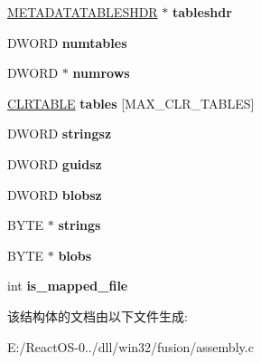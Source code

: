 \begin{DoxyCompactItemize}
\hyperlink{struct_m_e_t_a_d_a_t_a_t_a_b_l_e_s_h_d_r}{M\+E\+T\+A\+D\+A\+T\+A\+T\+A\+B\+L\+E\+S\+H\+DR} $\ast$ {\bfseries tableshdr}
\item 
\mbox{\label{structtag_a_s_s_e_m_b_l_y_a3613de571c417cc149481720220a6c7c}} 
D\+W\+O\+RD {\bfseries numtables}
\item 
\mbox{\label{structtag_a_s_s_e_m_b_l_y_a88a3d5b2f384314cdedd20bd1ce5ec3e}} 
D\+W\+O\+RD $\ast$ {\bfseries numrows}
\item 
\mbox{\label{structtag_a_s_s_e_m_b_l_y_a619124aeb08751554e52547e64e52961}} 
\hyperlink{struct___c_l_r_t_a_b_l_e}{C\+L\+R\+T\+A\+B\+LE} {\bfseries tables} \mbox{[}M\+A\+X\+\_\+\+C\+L\+R\+\_\+\+T\+A\+B\+L\+ES\mbox{]}
\item 
\mbox{\label{structtag_a_s_s_e_m_b_l_y_ad3c733dacd73d3662a51087ee2900585}} 
D\+W\+O\+RD {\bfseries stringsz}
\item 
\mbox{\label{structtag_a_s_s_e_m_b_l_y_ac10706351194dd3102bc1d7fd1d147e5}} 
D\+W\+O\+RD {\bfseries guidsz}
\item 
\mbox{\label{structtag_a_s_s_e_m_b_l_y_a6ebfbf24f856dcb8d64a5b835ee808f0}} 
D\+W\+O\+RD {\bfseries blobsz}
\item 
\mbox{\label{structtag_a_s_s_e_m_b_l_y_a75b91c8cbb1e16033ca8f8baabff4905}} 
B\+Y\+TE $\ast$ {\bfseries strings}
\item 
\mbox{\label{structtag_a_s_s_e_m_b_l_y_a5ce1bff2ce807bf1262b49e8278f95a5}} 
B\+Y\+TE $\ast$ {\bfseries blobs}
\item 
\mbox{\label{structtag_a_s_s_e_m_b_l_y_ae380fde1d1381a7395ff157aaa91d889}} 
int {\bfseries is\+\_\+mapped\+\_\+file}
\end{DoxyCompactItemize}


该结构体的文档由以下文件生成\+:\begin{DoxyCompactItemize}
\item 
E\+:/\+React\+O\+S-\/0../dll/win32/fusion/assembly.\+c\end{DoxyCompactItemize}
